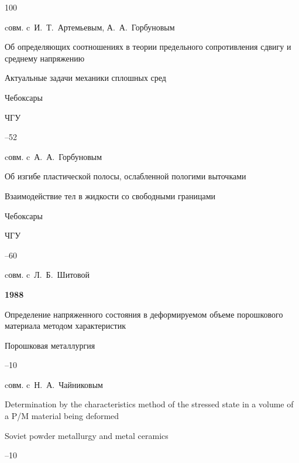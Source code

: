 \begin{thebibliography}{100}


\miscnote cовм. c~И.~Т.~Артемьевым, А.~А.~Горбуновым




\paper Об определяющих соотношениях в теории предельного сопротивления сдвигу и среднему напряжению 

\inbook Актуальные задачи механики сплошных сред

\publaddr Чебоксары

\publ ЧГУ


–52 

\miscnote cовм. c~А.~А.~Горбуновым




\paper Об изгибе пластической полосы, ослабленной пологими выточками 

\inbook Взаимодействие тел в жидкости со свободными границами

\publaddr Чебоксары

\publ ЧГУ


–60 

\miscnote cовм. c~Л.~Б.~Шитовой



\item[] \centerline{\bf 1988}




\paper Определение напряженного состояния в деформируемом объеме порошкового материала методом характеристик 

\jour Порошковая металлургия



–10 

\miscnote cовм. c~Н.~А.~Чайниковым

\transl

\paper Determination by the characteristics method of the stressed state in a volume of a P/M material being deformed

\jour Soviet powder metallurgy and metal ceramics




--10


\end{thebibliography}

